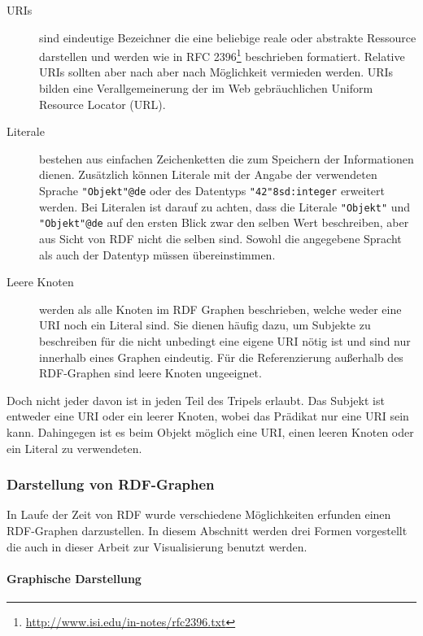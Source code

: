 \begin{description}
    \item[URIs] sind eindeutige Bezeichner die eine beliebige reale oder abstrakte Ressource darstellen und werden wie in RFC 2396\footnote{\url{http://www.isi.edu/in-notes/rfc2396.txt}} beschrieben formatiert. Relative URIs sollten aber nach \cite{Klyne2004} aber nach Möglichkeit vermieden werden. URIs bilden eine Verallgemeinerung der im Web gebräuchlichen Uniform Resource Locator (URL).
   
    \item[Literale] bestehen aus einfachen Zeichenketten die zum Speichern der Informationen dienen. Zusätzlich können Literale mit der Angabe der verwendeten Sprache \texttt{"Objekt"@de} oder des Datentyps \texttt{"42"^^xsd:integer} erweitert werden. Bei Literalen ist darauf zu achten, dass die Literale \texttt{"Objekt"} und \texttt{"Objekt"@de} auf den ersten Blick zwar den selben Wert beschreiben, aber aus Sicht von RDF nicht die selben sind. Sowohl die angegebene Spracht als auch der Datentyp müssen übereinstimmen.

    \item[Leere Knoten] werden als alle Knoten im RDF Graphen beschrieben, welche weder eine URI noch ein Literal sind. Sie dienen häufig dazu, um Subjekte zu beschreiben für die nicht unbedingt eine eigene URI nötig ist und sind nur innerhalb eines Graphen eindeutig. Für die Referenzierung außerhalb des RDF-Graphen sind leere Knoten ungeeignet.
\end{description}

Doch nicht jeder davon ist in jeden Teil des Tripels erlaubt. Das Subjekt ist entweder eine URI oder ein leerer Knoten, wobei das Prädikat nur eine URI sein kann. Dahingegen ist es beim Objekt möglich eine URI, einen leeren Knoten oder ein Literal zu verwendeten. 


\subsubsection{Darstellung von RDF-Graphen} %
\label{ssub:darstellung_von_rdf_graphen}

In Laufe der Zeit von RDF wurde verschiedene Möglichkeiten erfunden einen RDF-Graphen darzustellen. In diesem Abschnitt werden drei Formen vorgestellt die auch in dieser Arbeit zur Visualisierung benutzt werden. 

\paragraph{Graphische Darstellung} %
\label{par:graphische_darstellung}

